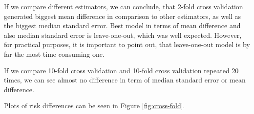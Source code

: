 \documentclass{article}
\begin{document}
If we compare different estimators, we can conclude, that 2-fold cross validation generated biggest mean difference in comparison to other estimators, as well as the biggest median standard error. Best model in terms of mean difference and also median standard error is leave-one-out, which was well expected. However, for practical purposes, it is important to point out, that leave-one-out model is by far the most time consuming one. 

If we compare 10-fold cross validation and 10-fold cross validation repeated 20 times, we can see almost no difference in term of median standard error or mean difference.

Plots of risk differences can be seen in Figure \ref{fig:cross-fold}.

\begin{figure}[!h]
    \centering

\end{figure}
\end{document}
